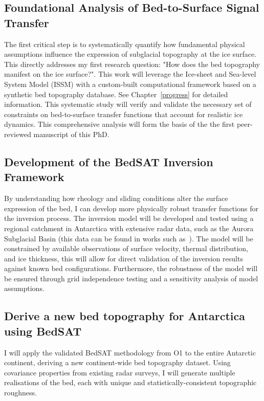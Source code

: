 \subsection{Foundational Analysis of Bed-to-Surface Signal Transfer}\label{paper1}

The first critical step is to systematically quantify how fundamental physical assumptions influence the expression of subglacial topography at the ice surface.
This directly addresses my first research question: "How does the bed topography manifest on the ice surface?". This work will leverage the Ice-sheet and Sea-level System Model (ISSM) with a custom-built computational framework based on a synthetic bed topography database. See Chapter~\ref{progress} for detailed information. This systematic study will verify and validate the necessary set of constraints on bed-to-surface transfer functions that account for realistic ice dynamics. This comprehensive analysis will form the basis of the the first peer-reviewed manuscript of this PhD.

\subsection{Development of the BedSAT Inversion Framework}

By understanding how rheology and sliding conditions alter the surface expression of the bed, I can develop more physically robust transfer functions for the inversion process. The inversion model will be developed and tested using a regional catchment in Antarctica with extensive radar data, such as the Aurora Subglacial Basin (this data can be found in works such as~\cite{Young_2011}). The model will be constrained by available observations of surface velocity, thermal distribution, and ice thickness, this will allow for direct validation of the inversion results against known bed configurations. Furthermore, the robustness of the model will be ensured through grid independence testing and a sensitivity analysis of model assumptions.

\subsection{Derive a new bed topography for Antarctica using BedSAT}

I will apply the validated BedSAT methodology from O1 to the entire Antarctic continent, deriving a new continent-wide bed topography dataset. Using covariance properties from existing radar surveys, I will generate multiple realisations of the bed, each with unique and statistically-consistent topographic roughness.

